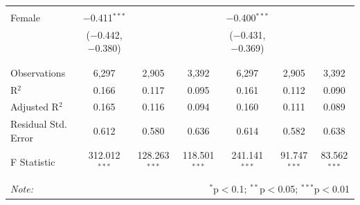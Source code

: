 \documentclass[12pt,a4paper]{article}
\numberwithin{equation}{section}
\begin{document}
\begin{landscape}
\begin{table}[!htbp]
\begin{tabular}{@{\extracolsep{5pt}}lcccccc}
			& & & & & & \\ 
			Female & $-$0.411$^{***}$ &  &  & $-$0.400$^{***}$ &  &  \\ 
			& ($-$0.442, $-$0.380) &  &  & ($-$0.431, $-$0.369) &  &  \\ 
			& & & & & & \\ 
			\hline \\[-1.8ex] 
			Observations & 6,297 & 2,905 & 3,392 & 6,297 & 2,905 & 3,392 \\ 
			R$^{2}$ & 0.166 & 0.117 & 0.095 & 0.161 & 0.112 & 0.090 \\ 
			Adjusted R$^{2}$ & 0.165 & 0.116 & 0.094 & 0.160 & 0.111 & 0.089 \\ 
			Residual Std. Error & 0.612 & 0.580 & 0.636 & 0.614 & 0.582 & 0.638 \\ 
			F Statistic & 312.012$^{***}$ & 128.263$^{***}$ & 118.501$^{***}$ & 241.141$^{***}$ & 91.747$^{***}$ & 83.562$^{***}$ \\ 
			\hline 
			\hline \\[-1.8ex] 
			\textit{Note:}  & \multicolumn{6}{r}{$^{*}$p$<$0.1; $^{**}$p$<$0.05; $^{***}$p$<$0.01} \\ 
		\end{tabular} 
	\end{table} 
	
\end{landscape}

\newpage
\end{document}
